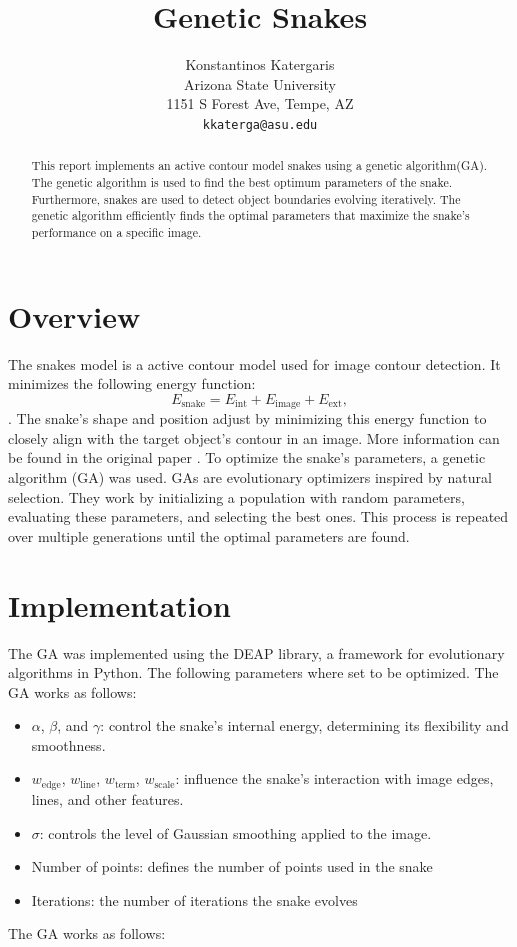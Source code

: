 \documentclass[10pt,twocolumn,letterpaper]{article}
\begin{document}
\title{Genetic Snakes}
\cvprfinalcopy
\author{Konstantinos Katergaris\\
Arizona State University\\
1151 S Forest Ave, Tempe, AZ\\
{\tt\small kkaterga@asu.edu}}


\maketitle
\begin{abstract}
This report implements an active contour model snakes using a genetic algorithm(GA). The genetic algorithm is used to find the best optimum parameters of the snake. Furthermore, snakes are used to detect object boundaries evolving iteratively. The genetic algorithm efficiently finds the optimal parameters that maximize the snake's performance on a specific image.
\end{abstract}
\section{Overview}
The snakes model is a active contour model  used for image contour detection. It minimizes the following energy function: \[ E_{\text{snake}} = E_{\text{int}} + E_{\text{image}} + E_{\text{ext}},\]. The snake’s shape and position adjust by minimizing this energy function to closely align with the target object’s contour in an image. More information can be found in the original paper \cite{4310076}.  To optimize the snake's parameters, a genetic algorithm (GA) was used. GAs are evolutionary optimizers inspired by natural selection. They work by initializing a population with random parameters, evaluating these parameters, and selecting the best ones. This process is repeated over multiple generations until the optimal parameters are found.

\section{Implementation}
The GA was implemented using the DEAP library, a framework for evolutionary algorithms in Python. The following parameters where set to be optimized. The GA works as follows: 
\begin{itemize}
    \item $\alpha$, $\beta$, and $\gamma$: control the snake's internal energy, determining its flexibility and smoothness.
    \item $w_{\text{edge}}$, $w_{\text{line}}$, $w_{\text{term}}$, $w_{\text{scale}}$: influence the snake’s interaction with image edges, lines, and other features.
    \item $\sigma$: controls the level of Gaussian smoothing applied to the image.
    \item Number of points: defines the number of points used in the snake
    \item Iterations: the number of iterations the snake evolves
\end{itemize}
The GA works as follows:
\end{document}
